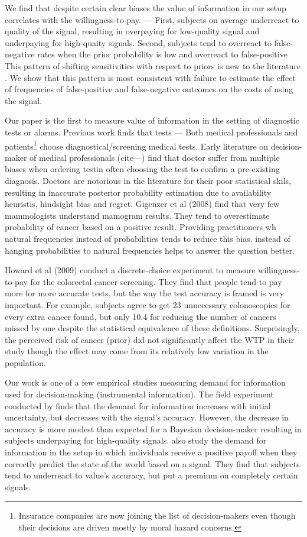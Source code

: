 \documentclass[12pt,a4paper]{article}
\begin{document}
We find that despite certain clear biases the value of information in our setup correlates with the willingness-to-pay. --- First, subjects on average underreact to quality of the signal, resulting in overpaying for low-quality signal and underpaying for high-quaity signals. Second, subjects tend to overreact to false-negative rates when the prior probability is low and overreact to false-positive  This pattern of shifting sensitivities with respect to priors is new to the literature . We show that this pattern is most consistent with failure to estimate the effect of frequencies of false-positive and false-negative outcomes on the costs of using the signal.

Our paper is the first to measure value of information in the setting of diagnostic tests or alarms. Previous work finds that tests --- Both medical professionals and patients\footnote{Insurance companies are now joining the list of decision-makers even though their decisions are driven mostly by moral hazard concerns.} choose diagnostical/screening medical tests. Early literature on decision-maker of medical professionals (cite---) find that doctor suffer from multiple biases when ordering testin often choosing the test to confirm a pre-existing diagnosis. Doctors are notorious in the literature for their poor statistical skils, resulting in inaccurate posterior probability estimation due to availability heuristis, hindsight bias and regret. Gigenzer et al (2008) find that very few mammologists understand mamogram results. They tend to overestimate probability of cancer based on a positive result. Providing practitioners wh natural frequencies instead of probabilities tends to reduce this bias.  instead of hanging probabilities to natural frequencies helps to answer the question better.

Howard et al (2009) conduct a discrete-choice experiment to measure willingness-to-pay for the colorectal cancer screening. They find that people tend to pay more for more accurate tests, but the way the test accuracy is framed is very important. For example, subjects agree to get 23 unnecessary colonoscopies for every extra cancer found, but only 10.4 for reducing the number of cancers missed by one despite the statistical equivalence of these definitions. Surprisingly, the perceived risk of cancer (prior) did not significantly affect the WTP in their study though the effect may come from its relatively low variation in the population.



Our work is one of a few empirical studies measuring demand for information used for decision-making (instrumental information). The field experiment conducted by \citep{hoffman_how_2016} finds that the demand for information increases with initial uncertainty, but decreases with the signal's accuracy. However, the decrease in accuracy is more modest than expected for a Bayesian decision-maker resulting in subjects underpaying for high-quality signals.  \citet{ambuehl_belief_2018} also study the demand for information in the setup in which individuals receive a positive payoff when they correctly predict the state of the world based on a signal. They find that subjects tend to underreact to value's accuracy, but put a premium on completely certain signals. 
\end{document}
